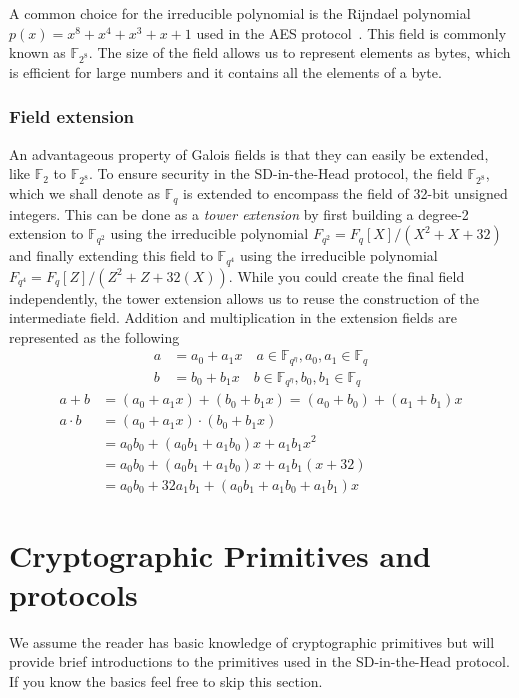 \documentclass[11pt]{report}
\theoremstyle{definition}
\theoremstyle{plain}
\begin{document}
A common choice for the irreducible polynomial is the Rijndael polynomial $p(x) = x^8 + x^4 + x^3 + x + 1$ used in the AES protocol~\cite{brownadvanced}. This field is commonly known as $\mathbb{F}_{2^8}$. The size of the field allows us to represent elements as bytes, which is efficient for large numbers and it contains all the elements of a byte.

\subsubsection{Field extension}\label{sub:field_extension}

An advantageous property of Galois fields is that they can easily be extended, like $\mathbb{F}_{2}$ to $\mathbb{F}_{2^8}$. To ensure security in the SD-in-the-Head protocol, the field $\mathbb{F}_{2^8}$, which we shall denote as $\mathbb{F}_q$ is extended to encompass the field of 32-bit unsigned integers. This can be done as a \textit{tower extension} by first building a degree-2 extension to $\mathbb{F}_{q^2}$ using the irreducible polynomial $F_{q^2} = F_q[X] / (X^2 + X + 32)$ and finally extending this field to $\mathbb{F}_{q^4}$ using the irreducible polynomial $F_{q^4} = F_q[Z] / (Z^2 + Z + 32(X))$. While you could create the final field independently, the tower extension allows us to reuse the construction of the intermediate field. Addition and multiplication in the extension fields are represented as the following
\begin{align*}
  a & = a_0 + a_1x  \quad a \in \mathbb{F}_{q^\eta}, a_0, a_1 \in \mathbb{F}_q \\
  b & = b_0 + b_1x  \quad b \in \mathbb{F}_{q^\eta}, b_0, b_1 \in \mathbb{F}_q
\end{align*}
\begin{align}
  a + b     & = (a_0 + a_1x) + (b_0 + b_1x) = (a_0 + b_0) + (a_1 + b_1)x               \nonumber \\
  a \cdot b & = (a_0 + a_1x) \cdot (b_0 + b_1x)                                        \nonumber \\
            & = a_0b_0 + (a_0b_1 + a_1b_0)x + a_1b_1x^2                                \nonumber \\
            & = a_0b_0 + (a_0b_1 + a_1b_0)x + a_1b_1(x + 32)                           \nonumber \\
            & = a_0b_0 + 32a_1b_1 + (a_0b_1 + a_1b_0 + a_1b_1)x\label{eq:gf256_ext_mul}
\end{align}

\section{Cryptographic Primitives and protocols}
We assume the reader has basic knowledge of cryptographic primitives but will provide brief introductions to the primitives used in the SD-in-the-Head protocol. If you know the basics feel free to skip this section.
\end{document}
